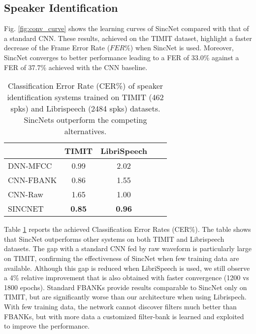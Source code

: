 \documentclass{article}
\begin{document}
\subsection{Speaker Identification}



Fig. \ref{fig:conv_curve} shows the learning curves of SincNet compared with that of a standard CNN. These results, achieved on the TIMIT dataset,  highlight a faster decrease of the Frame Error Rate ($FER\%$) when SincNet is used. Moreover, SincNet converges to better performance leading to a FER of 33.0\% against a FER of 37.7\% achieved with the CNN baseline. %

\begin{table}[h]
\centering
\begin{tabular}{|l|c|c|c|c|}
\hline
            & TIMIT & LibriSpeech  \\ \hline
DNN-MFCC             &   0.99      &  2.02      \\ \hline
CNN-FBANK       &   0.86      &  1.55     \\ \hline
CNN-Raw       &   1.65     &  1.00       \\ \hline
SINCNET       &   \textbf{0.85}      &  \textbf{0.96}      \\ \hline
\end{tabular}
\caption{Classification Error Rate (CER\%) of speaker identification systems trained on TIMIT (462 spks) and Librispeech (2484 spks) datasets. SincNets outperform the
competing alternatives.}
\label{tab:spk_id_res}
\end{table}

Table \ref{tab:spk_id_res} reports the achieved Classification Error Rates (CER\%). The table shows that  SincNet outperforms other systems on both TIMIT and Librispeech datasets. The gap with a standard CNN fed by raw waveform is particularly large on TIMIT, confirming the effectiveness of SincNet when few training data are available. Although this gap is reduced when LibriSpeech is used, we still observe a 4\% relative improvement that is also obtained with faster convergence (1200 vs 1800 epochs). Standard FBANKs provide results comparable to SincNet only on TIMIT, but are significantly worse than our architecture when using Librispech. With few training data, the network cannot discover filters much better than FBANKs, but with more data a customized filter-bank is learned and exploited to improve the performance.
\end{document}
